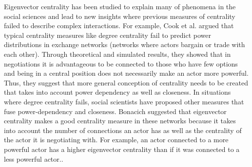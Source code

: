 \documentclass{article}
\theoremstyle{definition}
\theoremstyle{remark}
\begin{document}
Eigenvector centrality has been studied to explain many of phenomena in the social sciences and lead to new insights where previous measures of centrality failed to describe complex interactions.  For example, Cook et al. argued that typical centrality measures like degree centrality fail to predict power distributions in exchange networks (networks where actors bargain or trade with each other).\cite{cook1983distribution}  Through theoretical and simulated results, they showed that in negotiations it is advantageous to be connected to those who have few options and being in a central position does not necessarily make an actor more powerful.  Thus, they suggest that more general conception of centrality needs to be created that takes into account power dependency as well as closeness.  In situations where degree centrality fails, social scientists have proposed other measures that fuse power-dependency and closeness.  Bonacich suggested that eigenvector centrality makes a good centrality measure in these networks because it takes into account the number of connections an actor has as well as the centrality of the actor it is negotiating with.\cite{bonacich1987power}  For example, an actor connected to a more powerful actor has a higher eigenvector centrality than if it was connected to a less powerful actor.\cite{bonacich2007some}. \\
\end{document}
